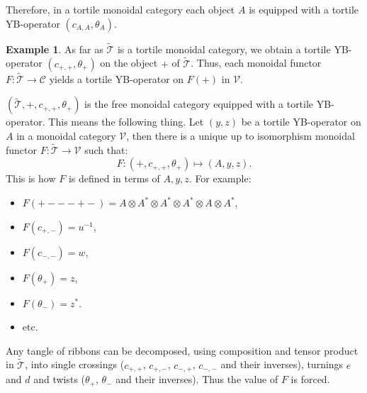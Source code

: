 \documentclass[8pt]{article}
\theoremstyle{definition}
\theoremstyle{definition}
\theoremstyle{definition}
\theoremstyle{definition}
\theoremstyle{definition}
\theoremstyle{definition}
\theoremstyle{definition}
\theoremstyle{definition}
\theoremstyle{definition}
\theoremstyle{definition}
\theoremstyle{definition}
\theoremstyle{definition}
\newtheorem{example}{Example}[section]
\theoremstyle{definition}
\theoremstyle{definition}
\theoremstyle{question}
\begin{document}
  Therefore, in a tortile monoidal category each object $A$ is equipped with a tortile YB-operator $(c_{A,A}, \theta_A)$.
  \begin{example}
    As far as $\tilde{\mathcal{T}}$ is a tortile monoidal category, we obtain a tortile YB-operator $(c_{+,+}, \theta_+)$ on the object $+$ of
    $\tilde{\mathcal{T}}$. Thus, each monoidal functor $F : \tilde{\mathcal{T}} \to \mathcal{C}$ yields a tortile YB-operator on $F(+)$ in $\mathcal{V}$.

    $(\tilde{\mathcal{T}}, +, c_{+,+}, \theta_+)$ is the free monoidal category equipped with a tortile YB-operator.
    This means the following thing. Let $(y,z)$ be a tortile YB-operator on $A$ in a monoidal category $\mathcal{V}$,
    then there is a unique up to isomorphism monoidal functor $F : \tilde{\mathcal{T}} \to \mathcal{V}$ such that:
    \[
    F : (+, c_{+,+}, \theta_+) \mapsto (A, y, z).
    \]
    This is how $F$ is defined in terms of $A, y, z$. For example:
    \begin{itemize}
      \item $F(+---+-) = A \otimes A^* \otimes A^* \otimes A^* \otimes A \otimes A^*$,
      \item $F(c_{+,-}) = u^{-1}$,
      \item $F(c_{-,-}) = w$,
      \item $F(\theta_+) = z$,
      \item $F(\theta_{-}) = z^*$.
      \item etc.
    \end{itemize}
    Any tangle of ribbons can be decomposed, using composition and tensor product in $\tilde{\mathcal{T}}$,
    into single crossings ($c_{+, +}$, $c_{+,-}$, $c_{-,+}$, $c_{-,-}$ and their inverses), turnings $e$ and $d$ and
    twists ($\theta_{+}$, $\theta_{-}$ and their inverses). Thus the value of $F$ is forced.
  \end{example}
\end{document}
